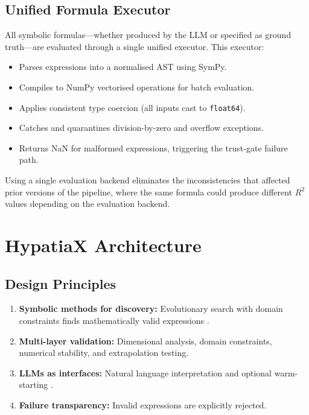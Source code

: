 \documentclass[twoside,11pt]{article}
\newcommand{\Rsq}{R^{2}}
\begin{document}
\subsection{Unified Formula Executor}\label{subsec:unified-formula-executor}
\label{sec:executor}

All symbolic formulas---whether produced by the LLM or specified as ground truth---are
evaluated through a single unified executor.  This executor:
\begin{itemize}
  \item Parses expressions into a normalised AST using SymPy.
  \item Compiles to NumPy vectorised operations for batch evaluation.
  \item Applies consistent type coercion (all inputs cast to \texttt{float64}).
  \item Catches and quarantines division-by-zero and overflow exceptions.
  \item Returns NaN for malformed expressions, triggering the trust-gate failure path.
\end{itemize}
Using a single evaluation backend eliminates the inconsistencies that affected
prior versions of the pipeline, where the same formula could produce different
$\Rsq$ values depending on the evaluation backend.

\section{HypatiaX Architecture}
\label{sec:architecture}

\subsection{Design Principles}\label{subsec:design-principles}
\label{sec:arch_principles}

\begin{enumerate}
\item \textbf{Symbolic methods for discovery:} Evolutionary search with domain
  constraints finds mathematically valid expressions \citep{cranmer2023pysr}.
\item \textbf{Multi-layer validation:} Dimensional analysis, domain constraints,
  numerical stability, and extrapolation testing.
\item \textbf{LLMs as interfaces:} Natural language interpretation and optional
  warm-starting \citep{kambhampati2024llms}.
\item \textbf{Failure transparency:} Invalid expressions are explicitly rejected.
\end{enumerate}
\end{document}
